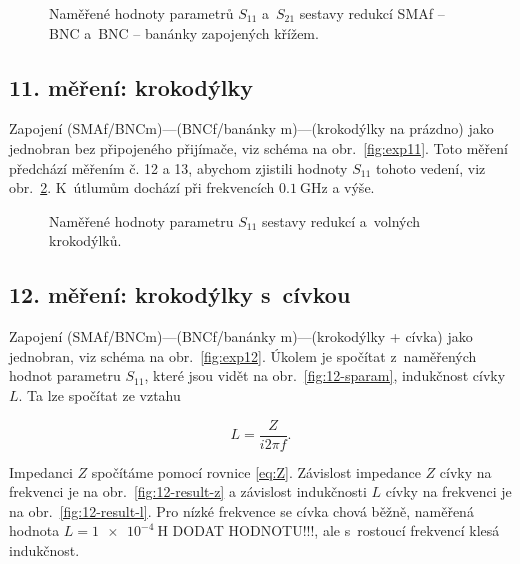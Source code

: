 \documentclass{protokol}
\newcommand\sparam{S}
\newcommand\female{f}
\newcommand\freq{f}
\newcommand\impedance{Z}
\newcommand\inductance{L}
\newcommand\connector[2]{#1 -- #2}
\begin{document}
\begin{figure}[htp]
	\centering
	
	
	\caption{Naměřené hodnoty parametrů $\sparam_{11}$ a~$\sparam_{21}$
		sestavy redukcí \connector{SMA\female}{BNC}
		a~\connector{BNC}{banánky} zapojených křížem.}
	\label{fig:10-sparam}
\end{figure}

\subsection{11. měření: krokodýlky}
Zapojení (SMAf/BNCm)---(BNCf/banánky m)---(krokodýlky na prázdno) jako 
jednobran bez připojeného přijímače, viz schéma na obr.~\ref{fig:exp11}. Toto 
měření předchází měřením č. 12 a 13, abychom zjistili hodnoty $\sparam_{11}$ 
tohoto vedení, viz obr.~\ref{fig:11-sparam}. K~útlumům dochází při frekvencích 
$\SI{0.1}{\giga\hertz}$ a výše.

\begin{figure}[htp]
	\centering
	
	\caption{Naměřené hodnoty parametru $\sparam_{11}$
		sestavy redukcí a~volných krokodýlků.}
	\label{fig:11-sparam}
\end{figure}

\subsection{12. měření: krokodýlky s~cívkou}
Zapojení (SMAf/BNCm)---(BNCf/banánky m)---(krokodýlky + cívka) jako jednobran, 
viz schéma na obr.~\ref{fig:exp12}. Úkolem je spočítat z~naměřených hodnot 
parametru $\sparam_{11}$, které jsou vidět na obr.~\ref{fig:12-sparam}, 
indukčnost cívky $\inductance$. Ta lze spočítat ze vztahu

\begin{equation}
	\inductance = \frac{\impedance}{i2\pi\freq}.
	\label{eq:inductance}
\end{equation}

Impedanci $\impedance$ spočítáme pomocí rovnice \eqref{eq:Z}. Závislost 
impedance $\impedance$ cívky na frekvenci je na obr.~\ref{fig:12-result-z} a 
závislost indukčnosti $\inductance$ cívky na frekvenci je na 
obr.~\ref{fig:12-result-l}. Pro nízké frekvence se cívka chová běžně, naměřená 
hodnota $\inductance = \SI{1e-4}{\henry}$ DODAT HODNOTU!!!, ale s~rostoucí 
frekvencí klesá indukčnost.
\end{document}
